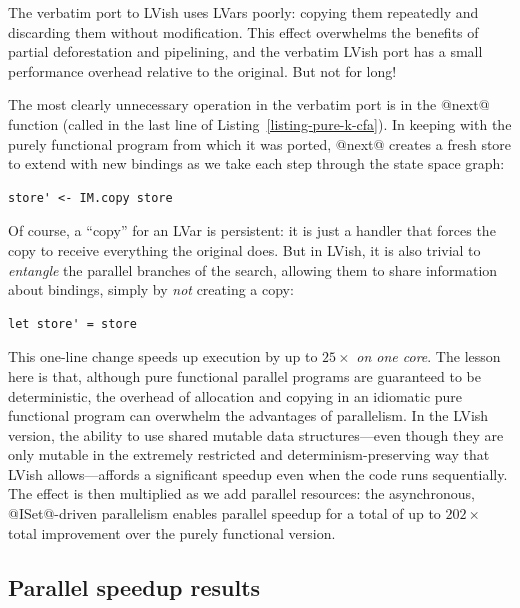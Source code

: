The verbatim port to LVish uses LVars poorly: copying them repeatedly
and discarding them without modification.  This effect overwhelms the
benefits of partial deforestation and pipelining, and the verbatim
LVish port has a small performance overhead relative to the original.
But not for long!

The most clearly unnecessary operation in the verbatim port is in the
@next@ function (called in the last line of
Listing~\ref{listing-pure-k-cfa}).  In keeping with the purely
functional program from which it was ported, @next@ creates a fresh
store to extend with new bindings as we take each step through the
state space graph:

\singlespacing
\begin{lstlisting}
store' <- IM.copy store 
\end{lstlisting}
\doublespacing

\noindent Of course, a ``copy'' for an LVar is persistent: it is just
a handler that forces the copy to receive everything the original
does.  But in LVish, it is also trivial to \emph{entangle} the
parallel branches of the search, allowing them to share information
about bindings, simply by \emph{not} creating a copy:

\singlespacing
\begin{lstlisting}
let store' = store 
\end{lstlisting}
\doublespacing

\noindent This one-line change speeds up execution by up to $25\times$
\emph{on one core}.  The lesson here is that, although pure functional
parallel programs are guaranteed to be deterministic, the overhead of
allocation and copying in an idiomatic pure functional program can
overwhelm the advantages of parallelism.  In the LVish version, the
ability to use shared mutable data structures---even though they are
only mutable in the extremely restricted and determinism-preserving
way that LVish allows---affords a significant speedup even when the
code runs sequentially.  The effect is then multiplied as we add
parallel resources: the asynchronous, @ISet@-driven parallelism
enables parallel speedup for a total of up to $202\times$ total
improvement over the purely functional version.

\subsection{Parallel speedup results}\label{subsection:lvish-parallel-speedup-results}

